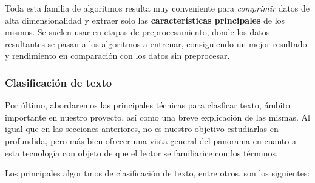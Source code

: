 Toda esta familia de algoritmos resulta muy conveniente para \textit{comprimir} datos de alta dimensionalidad y extraer solo las \textbf{características principales} de los mismos. Se suelen usar en etapas de preprocesamiento, donde los datos resultantes se pasan a los algoritmos a entrenar, consiguiendo un mejor resultado y rendimiento en comparación con los datos sin preprocesar.

\subsubsection{Clasificación de texto}
Por último, abordaremos las principales técnicas para clasficar texto, ámbito importante en nuestro proyecto, así como una breve explicación de las mismas. Al igual que en las secciones anteriores, no es nuestro objetivo estudiarlas en profundida, pero más bien ofrecer una vista general del panorama en cuanto a esta tecnología con objeto de que el lector se familiarice con los términos.


Los principales algoritmos de clasificación de texto, entre otros, son los siguientes:

